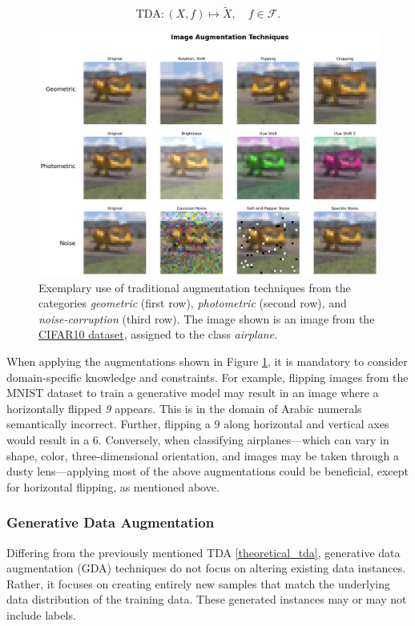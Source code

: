 \[
\text{TDA}: (X, f) \mapsto \tilde{X}, \quad f \in \mathcal{F}.
\]

\begin{figure}[htbp]
    \centering
    \includegraphics[width=.9\textwidth]{abb/traditional_image_augmentation_examples.png}
    \caption{Exemplary use of traditional augmentation techniques from the categories \textit{geometric} (first row), \textit{photometric} (second row), and \textit{noise-corruption} (third row). The image shown is an image from the \hyperref[used_datasets]{CIFAR10 dataset}, assigned to the class \textit{airplane}.}
    \label{fig:figure_tda_examples}
\end{figure}

\noindent
When applying the augmentations shown in Figure \ref{fig:figure_tda_examples}, it is mandatory to consider domain-specific knowledge and constraints. For example, flipping images from the MNIST dataset to train a generative model may result in an image where a horizontally flipped \textit{9} appears. This is in the domain of Arabic numerals semantically incorrect. Further, flipping a $9$ along horizontal and vertical axes would result in a $6$. Conversely, when classifying airplanes—which can vary in shape, color, three-dimensional orientation, and images may be taken through a dusty lens—applying most of the above augmentations could be beneficial, except for horizontal flipping, as mentioned above.


\subsubsection[Generative Data Augmentation - GDA]{Generative Data Augmentation}\label{theoretical_gda}
Differing from the previously mentioned TDA \ref{theoretical_tda}, generative data augmentation (GDA) techniques do not focus on altering existing data instances. Rather, it focuses on creating entirely new samples that match the underlying data distribution of the training data. These generated instances may or may not include labels.

